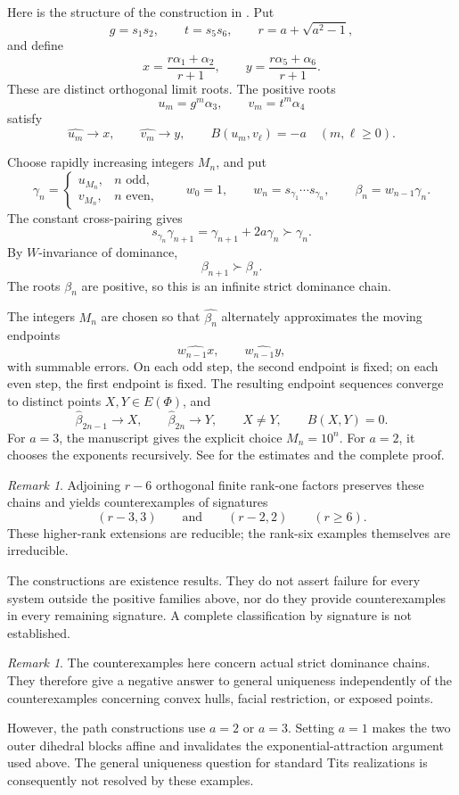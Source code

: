 \documentclass[11pt,reqno]{amsart}
\theoremstyle{plain}
\theoremstyle{definition}
\theoremstyle{remark}
\newtheorem{remark}[theorem]{Remark}
\numberwithin{equation}{section}
\begin{document}
Here is the structure of the construction in
\cite[Section~4.3]{WangUniqueness}.
Put
\[
g=s_1s_2,
\qquad
t=s_5s_6,
\qquad
r=a+\sqrt{a^2-1},
\]
and define
\[
x=\frac{r\alpha_1+\alpha_2}{r+1},
\qquad
y=\frac{r\alpha_5+\alpha_6}{r+1}.
\]
These are distinct orthogonal limit roots.
The positive roots
\[
u_m=g^m\alpha_3,
\qquad
v_m=t^m\alpha_4
\]
satisfy
\[
\widehat{u_m}\longrightarrow x,
\qquad
\widehat{v_m}\longrightarrow y,
\qquad
B(u_m,v_\ell)=-a
\quad(m,\ell\ge0).
\]

Choose rapidly increasing integers $M_n$, and put
\[
\gamma_n=
\begin{cases}
u_{M_n},&n\text{ odd},\\
v_{M_n},&n\text{ even},
\end{cases}
\qquad
w_0=1,
\qquad
w_n=s_{\gamma_1}\cdots s_{\gamma_n},
\qquad
\beta_n=w_{n-1}\gamma_n.
\]
The constant cross-pairing gives
\[
s_{\gamma_n}\gamma_{n+1}
=\gamma_{n+1}+2a\gamma_n
\succ\gamma_n.
\]
By $W$-invariance of dominance,
\[
\beta_{n+1}\succ\beta_n.
\]
The roots $\beta_n$ are positive, so this is an infinite strict
dominance chain.

The integers $M_n$ are chosen so that
$\widehat{\beta_n}$ alternately approximates the moving endpoints
\[
\widehat{w_{n-1}x},
\qquad
\widehat{w_{n-1}y},
\]
with summable errors.
On each odd step, the second endpoint is fixed; on each even
step, the first endpoint is fixed.
The resulting endpoint sequences converge to distinct points
$X,Y\in E(\Phi)$, and
\[
\widehat{\beta}_{2n-1}\longrightarrow X,
\qquad
\widehat{\beta}_{2n}\longrightarrow Y,
\qquad
X\ne Y,
\qquad
B(X,Y)=0.
\]
For $a=3$, the manuscript gives the explicit choice $M_n=10^n$.
For $a=2$, it chooses the exponents recursively.
See \cite[Proposition~4.10 and Remark~4.11]{WangUniqueness}
for the estimates and the complete proof.

\begin{remark}
Adjoining $r-6$ orthogonal finite rank-one factors preserves
these chains and yields counterexamples of signatures
\[
(r-3,3)
\qquad\text{and}\qquad
(r-2,2)
\qquad(r\ge6).
\]
These higher-rank extensions are reducible; the rank-six
examples themselves are irreducible.

The constructions are existence results.
They do not assert failure for every system outside the
positive families above, nor do they provide counterexamples
in every remaining signature.
A complete classification by signature is not established.
\end{remark}

\begin{remark}
The counterexamples here concern actual strict dominance chains.
They therefore give a negative answer to general uniqueness
independently of the counterexamples concerning convex hulls,
facial restriction, or exposed points.

However, the path constructions use $a=2$ or $a=3$.
Setting $a=1$ makes the two outer dihedral blocks affine and
invalidates the exponential-attraction argument used above.
The general uniqueness question for standard Tits realizations
is consequently not resolved by these examples.
\end{remark}
\end{document}
